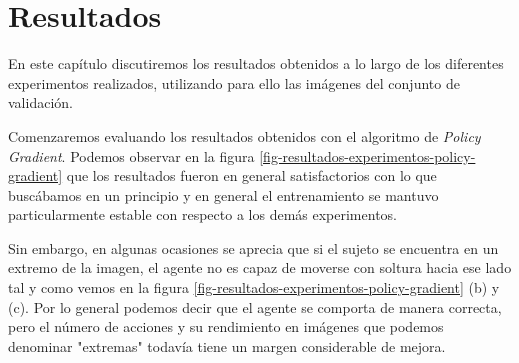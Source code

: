 \cleardoublepage

\chapter{Resultados}
\label{resultados}

En este capítulo discutiremos los resultados obtenidos a lo largo de los diferentes experimentos realizados, utilizando para ello las imágenes del conjunto de validación.
\medskip

Comenzaremos evaluando los resultados obtenidos con el algoritmo de \textit{Policy Gradient}. Podemos observar en la figura \ref{fig-resultados-experimentos-policy-gradient} que los resultados fueron en general satisfactorios con lo que buscábamos en un principio y en general el entrenamiento se mantuvo particularmente estable con respecto a los demás experimentos.
\medskip

Sin embargo, en algunas ocasiones se aprecia que si el sujeto se encuentra en un extremo de la imagen, el agente no es capaz de moverse con soltura hacia ese lado tal y como vemos en la figura \ref{fig-resultados-experimentos-policy-gradient} (b) y (c). Por lo general podemos decir que el agente se comporta de manera correcta, pero el número de acciones y su rendimiento en imágenes que podemos denominar "extremas" todavía tiene un margen considerable de mejora.
\medskip

